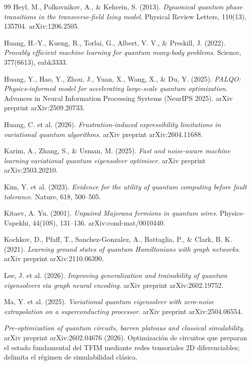 \documentclass[11pt,a4paper,spanish]{book}
\begin{document}
\begin{thebibliography}{99}
 Heyl, M., Polkovnikov, A., \& Kehrein, S. (2013). \emph{Dynamical quantum phase transitions in the transverse-field Ising model}. Physical Review Letters, 110(13), 135704. arXiv:1206.2505.

 Huang, H.-Y., Kueng, R., Torlai, G., Albert, V. V., \& Preskill, J. (2022). \emph{Provably efficient machine learning for quantum many-body problems}. Science, 377(6613), eabk3333.

 Huang, Y., Hao, Y., Zhou, J., Yuan, X., Wang, X., \& Du, Y. (2025). \emph{PALQO: Physics-informed model for accelerating large-scale quantum optimization}. Advances in Neural Information Processing Systems (NeurIPS 2025). arXiv preprint arXiv:2509.20733.

 Huang, C. et al. (2026). \emph{Frustration-induced expressibility limitations in variational quantum algorithms}. arXiv preprint arXiv:2604.11688.

 Karim, A., Zhang, S., \& Usman, M. (2025). \emph{Fast and noise-aware machine learning variational quantum eigensolver optimiser}. arXiv preprint arXiv:2503.20210.

 Kim, Y. et al. (2023). \emph{Evidence for the utility of quantum computing before fault tolerance}. Nature, 618, 500--505.

 Kitaev, A. Yu. (2001). \emph{Unpaired Majorana fermions in quantum wires}. Physics-Uspekhi, 44(10S), 131--136. arXiv:cond-mat/0010440.

 Kochkov, D., Pfaff, T., Sanchez-Gonzalez, A., Battaglia, P., \& Clark, B. K. (2021). \emph{Learning ground states of quantum Hamiltonians with graph networks}. arXiv preprint arXiv:2110.06390.

 Lee, J. et al. (2026). \emph{Improving generalization and trainability of quantum eigensolvers via graph neural encoding}. arXiv preprint arXiv:2602.19752.

 Ma, Y. et al. (2025). \emph{Variational quantum eigensolver with zero-noise extrapolation on a superconducting processor}. arXiv preprint arXiv:2504.06554.

 \emph{Pre-optimization of quantum circuits, barren plateaus and classical simulability}. arXiv preprint arXiv:2602.04676 (2026). Optimización de circuitos que preparan el estado fundamental del TFIM mediante redes tensoriales 2D diferenciables; delimita el régimen de simulabilidad clásica.


\end{thebibliography}
\end{document}

